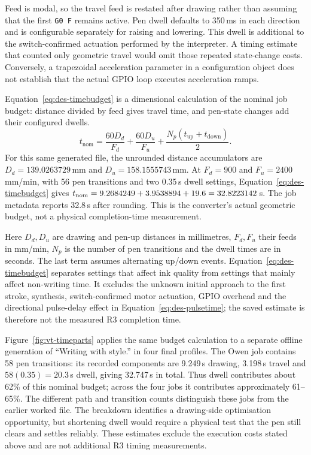 Feed is modal, so the travel feed is restated after drawing rather than assuming that the first \texttt{G0 F} remains active. Pen dwell defaults to 350\,ms in each direction and is configurable separately for raising and lowering. This dwell is additional to the switch-confirmed actuation performed by the interpreter. A timing estimate that counted only geometric travel would omit those repeated state-change costs. Conversely, a trapezoidal acceleration parameter in a configuration object does not establish that the actual GPIO loop executes acceleration ramps.

Equation~\ref{eq:des-timebudget} is a dimensional calculation of the nominal job budget: distance divided by feed gives travel time, and pen-state changes add their configured dwells.
\begin{equation}
t_{\mathrm{nom}}=\frac{60D_d}{F_d}+\frac{60D_u}{F_u}
+\frac{N_p(t_{\mathrm{up}}+t_{\mathrm{down}})}{2}.
\label{eq:des-timebudget}
\end{equation}
For this same generated file, the unrounded distance accumulators are $D_d=139.0263729$\,mm and $D_u=158.1555743$\,mm. At $F_d=900$ and $F_u=2400$\,mm/min, with 56 pen transitions and two 0.35\,s dwell settings, Equation~\ref{eq:des-timebudget} gives $t_{\rm nom}=9.2684249+3.9538894+19.6=32.8223142$\,s. The job metadata reports 32.8\,s after rounding. This is the converter's actual geometric budget, not a physical completion-time measurement.

Here $D_d,D_u$ are drawing and pen-up distances in millimetres, $F_d,F_u$ their feeds in mm/min, $N_p$ is the number of pen transitions and the dwell times are in seconds. The last term assumes alternating up/down events. Equation~\ref{eq:des-timebudget} separates settings that affect ink quality from settings that mainly affect non-writing time. It excludes the unknown initial approach to the first stroke, synthesis, switch-confirmed motor actuation, GPIO overhead and the directional pulse-delay effect in Equation~\ref{eq:des-pulsetime}; the saved estimate is therefore not the measured R3 completion time.

Figure~\ref{fig:vt-timeparts} applies the same budget calculation to a separate offline generation of ``Writing with style.'' in four final profiles. The Owen job contains 58 pen transitions: its recorded components are 9.249\,s drawing, 3.198\,s travel and $58(0.35)=20.3$\,s dwell, giving 32.747\,s in total. Thus dwell contributes about 62\% of this nominal budget; across the four jobs it contributes approximately 61--65\%. The different path and transition counts distinguish these jobs from the earlier worked file. The breakdown identifies a drawing-side optimisation opportunity, but shortening dwell would require a physical test that the pen still clears and settles reliably. These estimates exclude the execution costs stated above and are not additional R3 timing measurements.

